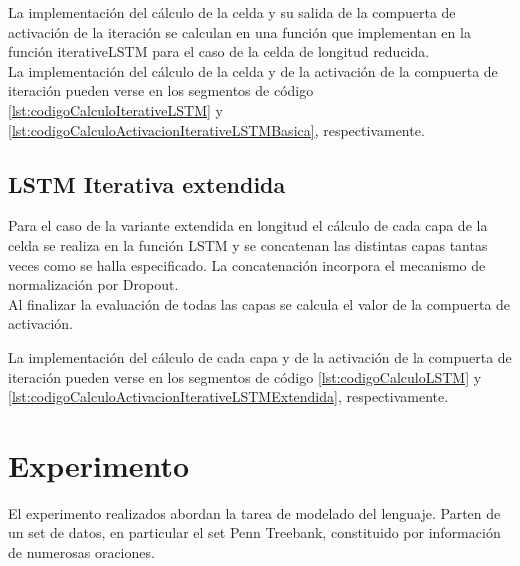 \documentclass{article}
\begin{document}
La implementación del cálculo de la celda y su salida de la compuerta de activación de la iteración se calculan en una función que implementan en la función iterativeLSTM para el caso de la celda de longitud reducida.\\

La implementación del cálculo de la celda y de la activación de la compuerta de iteración pueden verse en los segmentos de código \ref{lst:codigoCalculoIterativeLSTM} y \ref{lst:codigoCalculoActivacionIterativeLSTMBasica}, respectivamente.





\subsection{LSTM Iterativa extendida}
Para el caso de la variante extendida en longitud el cálculo de cada capa de la celda se realiza en la función LSTM y se concatenan las distintas capas tantas veces como se halla especificado. La concatenación incorpora el mecanismo de normalización por Dropout.\\
Al finalizar la evaluación de todas las capas se calcula el valor de la compuerta de activación.

La implementación del cálculo de cada capa y de la activación de la compuerta de iteración pueden verse en los segmentos de código \ref{lst:codigoCalculoLSTM} y \ref{lst:codigoCalculoActivacionIterativeLSTMExtendida}, respectivamente.






\section{Experimento}
El experimento realizados abordan la tarea de modelado del lenguaje. Parten de un set de datos, en particular el set Penn Treebank, constituido por información de numerosas oraciones.
\end{document}
